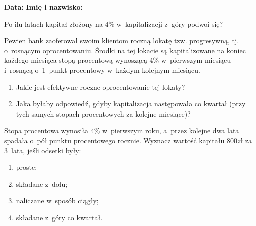 \documentclass[addpoints]{exam}
\begin{document}
\raggedleft \textbf {Data:\enspace\makebox[2in]{\hrulefill}} 
\hfill  \textbf{Imię i nazwisko: \enspace\makebox[2in]{\hrulefill}}
	
\vspace{0.1in}

	\begin{questions}

  \question
    Po ilu latach kapitał złożony na 4\% w~kapitalizacji z~góry podwoi się?

  \question
    Pewien bank zaoferował swoim klientom roczną lokatę
    tzw. progresywną, tj. o~rosnącym oprocentowaniu.  Środki na tej
    lokacie są kapitalizowane na koniec każdego miesiąca stopą
    procentową wynoszącą 4\% w~pierwszym miesiącu i~rosnącą o~1~punkt
    procentowy w~każdym kolejnym miesiącu.
    \begin{enumerate}
    \item Jakie jest efektywne roczne oprocentowanie tej lokaty?
    \item Jaka byłaby odpowiedź, gdyby kapitalizacja następowała co
      kwartał (przy tych samych stopach procentowych za kolejne
      miesiące)?
    \end{enumerate}

  \question
    Stopa procentowa wynosiła 4\% w~pierwszym roku, a~przez kolejne dwa lata
    spadała o~pół punktu procentowego rocznie.  Wyznacz wartość kapitału
    $800zł$ za 3~lata, jeśli odsetki były:
    \begin{enumerate}
    \item proste;
    \item składane z~dołu;
    \item naliczane w~sposób ciągły;
    \item składane z~góry co kwartał.
    \end{enumerate}



	\end{questions}
\end{document}
